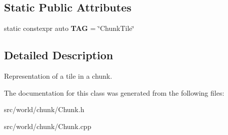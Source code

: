 \subsection*{Static Public Attributes}
\begin{DoxyCompactItemize}
\item 
\hypertarget{classChunkTile_a321f107b80df537c1d2abbe36bf13df1}{static constexpr auto {\bfseries T\-A\-G} = \char`\"{}Chunk\-Tile\char`\"{}}\label{classChunkTile_a321f107b80df537c1d2abbe36bf13df1}

\end{DoxyCompactItemize}


\subsection{Detailed Description}
Representation of a tile in a chunk. 

The documentation for this class was generated from the following files\-:\begin{DoxyCompactItemize}
\item 
src/world/chunk/Chunk.\-h\item 
src/world/chunk/Chunk.\-cpp\end{DoxyCompactItemize}
